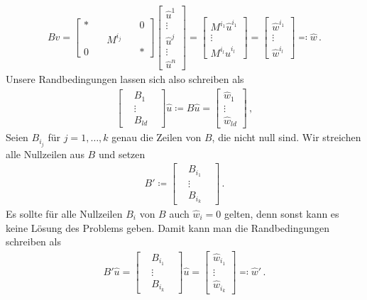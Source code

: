 \documentclass{scrartcl}
\newcommand{\hu}{\hat{u}}
\newcommand{\hv}{\hat{v}}
\newcommand{\hw}{\hat{w}}
\newcommand{\vect}[1]{\begin{bmatrix} #1 \end{bmatrix}}
\begin{document}
\begin{align*}
	B\hv = 
	\begin{bmatrix}
		*\quad & & \quad0 \\
		& M^{i_j} & \\
		0\quad & & \quad*
	\end{bmatrix} 
	\vect{\hu^1 \\ \vdots \\ \hu^j \\ \vdots \\ \hu^n}
	= \vect{M^{i_1}\hu^{i_1} \\ \vdots \\ M^{i_l}\hu^{i_l}}
	= \vect{\hw^{i_1} \\ \vdots \\ \hw^{i_l}}
	\eqqcolon \hw\,.
\end{align*}
Unsere Randbedingungen lassen sich also schreiben als
\begin{align*}
	\begin{bmatrix}
		& B_{1} & \\
		& \vdots & \\
		& B_{ld} &
	\end{bmatrix}\hu \coloneqq B\hu=  \vect{\hw_1 \\ \vdots \\ \hw_{ld}}\,,
\end{align*}
Seien $B_{i_j}$ für $j=1,\dots,k$ genau die Zeilen von $B$, die nicht null sind. Wir streichen alle Nullzeilen aus $B$ und setzen
\begin{align*}
	B'\coloneqq\begin{bmatrix}
		& B_{i_1} & \\
		& \vdots & \\
		& B_{i_k} &
	\end{bmatrix}\,.
\end{align*}
Es sollte für alle Nullzeilen $B_i$ von $B$ auch $\hw_i=0$ gelten, denn sonst kann es keine Lösung des Problems geben. Damit kann man die Randbedingungen schreiben als
\begin{align}
	B'\hu = \begin{bmatrix}
		& B_{i_1} & \\
		& \vdots & \\
		& B_{i_k} &
	\end{bmatrix}\hu
	= \vect{\hw_{i_1} \\ \vdots \\ \hw_{i_k}}
	\eqqcolon \hw'\,.
	\label{eq:discretisationRandbedingungen}
\end{align}
\end{document}
